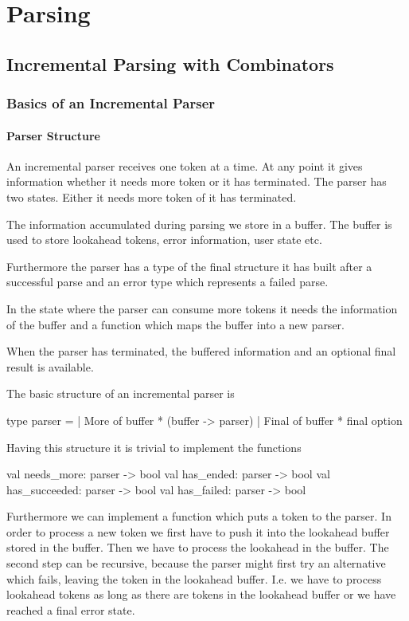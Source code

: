 \chapter{Parsing}

\section{Incremental Parsing with Combinators}

\subsection{Basics of an Incremental Parser}

\subsubsection{Parser Structure}

An incremental parser receives one token at a time. At any point it gives
information whether it needs more token or it has terminated. The parser has
two states. Either it needs more token of it has terminated.

The information accumulated during parsing we store in a buffer. The buffer is
used to store lookahead tokens, error information, user state etc.

Furthermore the parser has a type of the final structure it has built after a
successful parse and an error type which represents a failed parse.

In the state where the parser can consume more tokens it needs the information
of the buffer and a function which maps the buffer into a new parser.

When the parser has terminated, the buffered information and an optional final
result is available.


The basic structure of an incremental parser is
\begin{ocaml}
  type parser =
    | More of buffer * (buffer -> parser)
    | Final of buffer * final option
\end{ocaml}

Having this structure it is trivial to implement the functions
\begin{ocaml}
  val needs_more:    parser -> bool
  val has_ended:     parser -> bool
  val has_succeeded: parser -> bool
  val has_failed:    parser -> bool
\end{ocaml}

Furthermore we can implement a function which puts a token to the parser. In
order to process a new token we first have to push it into the lookahead
buffer stored in the buffer. Then we have to process the lookahead in the
buffer. The second step can be recursive, because the parser might first try
an alternative which fails, leaving the token in the lookahead buffer. I.e. we
have to process lookahead tokens as long as there are tokens in the lookahead
buffer or we have reached a final error state.

